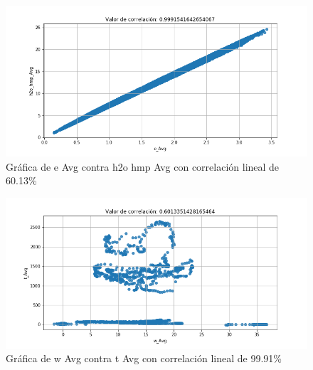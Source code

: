 \documentclass[12pt]{article}
\begin{document}
\begin{figure}
    \centering
    \includegraphics[scale = .53]{evh.png}
    \caption{Gr\'afica de e Avg contra h2o hmp Avg con correlaci\'on lineal de 60.13\%}
    \label{fig:evh2o}
\end{figure}
\begin{figure}
    \centering
    \includegraphics[scale = .53]{wvt.png}
    \caption{Gr\'afica de w Avg contra t Avg con correlaci\'on lineal de 99.91\%}
    \label{fig:wvt}
\end{figure}
\end{document}
